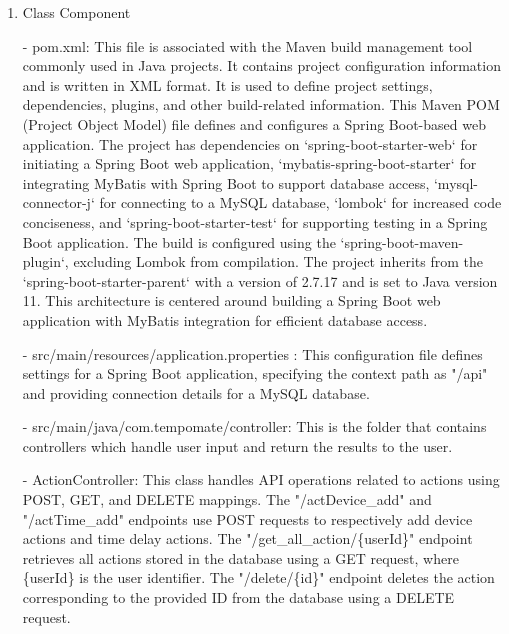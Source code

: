 \begin{enumerate}
\begin{enumerate}
                    \end{enumerate}
                        \item Class Component \\
                        \item[-] pom.xml: This file is associated with the Maven build management tool commonly used in Java projects. It contains project configuration information and is written in XML format. It is used to define project settings, dependencies, plugins, and other build-related information. This Maven POM (Project Object Model) file defines and configures a Spring Boot-based web application. The project has dependencies on `spring-boot-starter-web` for initiating a Spring Boot web application, `mybatis-spring-boot-starter` for integrating MyBatis with Spring Boot to support database access, `mysql-connector-j` for connecting to a MySQL database, `lombok` for increased code conciseness, and `spring-boot-starter-test` for supporting testing in a Spring Boot application. The build is configured using the `spring-boot-maven-plugin`, excluding Lombok from compilation. The project inherits from the `spring-boot-starter-parent` with a version of 2.7.17 and is set to Java version 11. This architecture is centered around building a Spring Boot web application with MyBatis integration for efficient database access. \\
                        \item[-] src/main/resources/application.properties : This configuration file defines settings for a Spring Boot application, specifying the context path as "/api" and providing connection details for a MySQL database.\\
                        \item[-] src/main/java/com.tempomate/controller: This is the folder that contains controllers which handle user input and return the results to the user. \\
                        \item[-] ActionController: This class handles API operations related to actions using POST, GET, and DELETE mappings. The "/actDevice\_add" and "/actTime\_add" endpoints use POST requests to respectively add device actions and time delay actions. The "/get\_all\_action/\{userId\}" endpoint retrieves all actions stored in the database using a GET request, where \{userId\} is the user identifier. The "/delete/\{id\}" endpoint deletes the action corresponding to the provided ID from the database using a DELETE request.\\

\end{enumerate}
